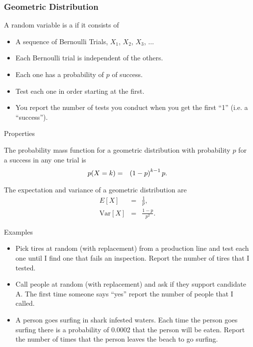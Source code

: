 \begin{frame}
  \frametitle{Geometric Distribution}

  \begin{definition}
    A random variable is a  if it
    consists of
    \begin{itemize}
    \item A sequence of Bernoulli Trials, $X_1$, $X_2$, $X_3$,
      $\ldots$
    \item Each Bernoulli trial is independent of the others.
    \item Each one has a probability of $p$ of success.
    \item Test each one in order starting at the first.
    \item You report the number of tests you conduct when you get the
      first ``1'' (i.e. a ``success''). 
    \end{itemize}
  \end{definition}


\end{frame}

\begin{frame}{Properties}

  The probability mass function for a geometric distribution with
  probability $p$ for a success in any one trial is
  \begin{eqnarray*}
    p(X=k) & = & \left( 1-p\right)^{k-1} p.
  \end{eqnarray*}

  The expectation and variance of a geometric distribution are
  \begin{eqnarray*}
    E[X] & = & \frac{1}{p}, \\
    \mathrm{Var}[X] & = & \frac{1-p}{p^2}.
  \end{eqnarray*}

\end{frame}


\begin{frame}{Examples}

  \begin{itemize}
  \item Pick tires at random (with replacement) from a production line
    and test each one until I find one that fails an
    inspection. Report the number of
    tires that I tested.\\
  \item Call people at random (with replacement) and ask if they
    support candidate A. The first time someone says ``yes'' report
    the number of people that I called.
  \item A person goes surfing in shark infested waters. Each time the
    person goes surfing there is a probability of 0.0002 that the
    person will be eaten. Report the number of times that the person
    leaves the beach to go surfing.
  \end{itemize}
  
\end{frame}

